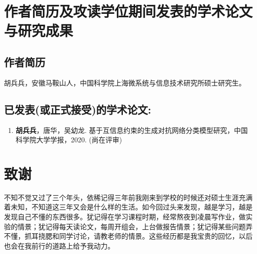 \chapter{作者简历及攻读学位期间发表的学术论文与研究成果}


\section*{作者简历}

胡兵兵，安徽马鞍山人，中国科学院上海微系统与信息技术研究所硕士研究生。

\section*{已发表(或正式接受)的学术论文:}

{
\setlist[enumerate]{}%
\begin{enumerate}[nosep]
    \item \textbf{胡兵兵}，唐华，吴幼龙. 基于互信息约束的生成对抗网络分类模型研究，中国科学院大学学报，2020. (尚在评审)
\end{enumerate}
}

% 
% 
% 

\chapter[致谢]{致\quad 谢}%
\thispagestyle{noheaderstyle}%

不知不觉又过了三个年头，依稀记得三年前我刚来到学校的时候还对硕士生涯充满着未知，不知道这三年又会是什么样的生活。如今回过头来发现，越是学习，越是发现自己不懂的东西很多。犹记得在学习课程时期，经常熬夜到凌晨写作业，做实验的情景；犹记得每天读论文，每周开组会，上台做报告情景；犹记得某些问题弄不懂，抓耳挠腮和同学讨论，请教老师的情景。这些经历都是我宝贵的回忆，以后也会在我前行的道路上给予我动力。

